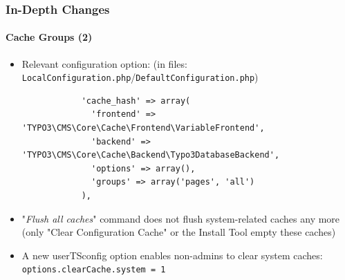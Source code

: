 \begin{frame}[fragile]
	\frametitle{In-Depth Changes}
	\framesubtitle{Cache Groups (2)}

	\lstset{
		basicstyle=\tiny\ttfamily
	}

	\begin{itemize}

		\item Relevant configuration option:\newline
			\smaller(in files: \texttt{LocalConfiguration.php}/\texttt{DefaultConfiguration.php})\normalsize

			\begin{lstlisting}
			'cache_hash' => array(
			  'frontend' => 'TYPO3\CMS\Core\Cache\Frontend\VariableFrontend',
			  'backend' => 'TYPO3\CMS\Core\Cache\Backend\Typo3DatabaseBackend',
			  'options' => array(),
			  'groups' => array('pages', 'all')
			),
			\end{lstlisting}

		\item "\textit{Flush all caches}" command does not flush system-related caches any more
			(only "Clear Configuration Cache" or the Install Tool empty these caches)
		\item A new userTSconfig option enables non-admins to clear system caches:\newline
			\smaller\texttt{options.clearCache.system = 1}\normalsize

		\breakingchange

	\end{itemize}

\end{frame}


